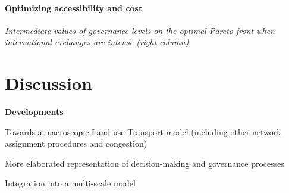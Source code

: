 \documentclass[12pt]{iopart}
\begin{document}
{\paragraph{Optimizing accessibility and cost}



\textit{Intermediate values of governance levels on the optimal Pareto front when international exchanges are intense (right column)}






\section{Discussion}









\textbf{Developments}

Towards a macroscopic Land-use Transport model (including other network assignment procedures and congestion)

More elaborated representation of decision-making and governance processes


Integration into a multi-scale model \cite{raimbault:halshs-02351722}


}
\end{document}
